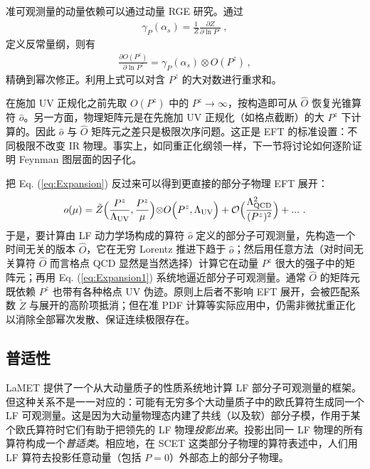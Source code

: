 准可观测量的动量依赖可以通过动量 RGE 研究。通过
\begin{align}
	\gamma_P(\alpha_s) = \frac{1}{Z}\frac{\partial Z}{\partial \ln P^z} \ ,
\end{align}
定义反常量纲，则有
\begin{align}
	\frac{\partial O(P^z)}{\partial \ln P^z} = \gamma_P(\alpha_s) \otimes O(P^z) \,,
\end{align}
精确到幂次修正。利用上式可以对含 $P^z$ 的大对数进行重求和。

在施加 UV 正规化之前先取 $O(P^z)$ 中的 $P^z\rightarrow \infty$，按构造即可从 $\hat O$ 恢复光锥算符 $\hat o$。另一方面，物理矩阵元是在先施加 UV 正规化（如格点截断）的大 $P^z$ 下计算的。因此 $\hat o$ 与 $\hat O$ 矩阵元之差只是极限次序问题。这正是 EFT 的标准设置：不同极限不改变 IR 物理。事实上，如同重正化纲领一样，下一节将讨论如何逐阶证明 Feynman 图层面的因子化。

把 Eq. (\ref{eq:Expansion}) 反过来可以得到更直接的部分子物理 EFT 展开：
\begin{align}
	o(\mu)= \tilde Z\Big({P^z\over\Lambda_{\rm UV}},
	{P^z\over \mu}\Big){\otimes} O\Big(P^z,\Lambda_{\rm UV}\Big) + {\cal O}\Big({\Lambda_{\rm QCD}^2\over (P^z)^2}\Big)+ ... \ .
	\label{eq:Expansion1}
\end{align}
于是，要计算由 LF 动力学场构成的算符 $\hat o$ 定义的部分子可观测量，先构造一个时间无关的版本 $\hat O$，它在无穷 Lorentz 推进下趋于 $\hat o$；然后用任意方法（对时间无关算符 $\hat O$ 而言格点 QCD 显然是当然选择）计算它在动量 $P^z$ 很大的强子中的矩阵元；再用 Eq. (\ref{eq:Expansion1}) 系统地逼近部分子{可观测量}。通常 $\hat O$ 的矩阵元既依赖 $P^z$ 也带有各种格点 UV 伪迹。原则上后者不影响 EFT 展开，会被匹配系数 $\tilde Z$ 与展开的高阶项抵消；但在准 PDF 计算等实际应用中，仍需非微扰重正化以消除全部幂次发散、保证连续极限存在。

\subsection{普适性}
\label{sec:lamet-univ}
LaMET 提供了一个从大动量质子的性质系统地计算 LF 部分子可观测量的框架。但这种关系不是一一对应的：可能有无穷多个大动量质子中的欧氏算符生成同一个 LF 可观测量。这是因为大动量物理态内建了共线（以及软）部分子模，作用于某个欧氏算符时它们有助于把领先的 LF 物理{\it 投影出来}。投影出同一 LF 物理的所有算符构成一个{\it 普适类}。相应地，在 SCET 这类部分子物理的算符表述中，人们用 LF 算符去投影任意动量（包括 $P=0$）外部态上的部分子物理。

